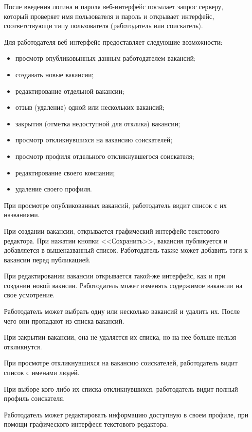 \documentclass[a4page]{article}
\begin{document}
После введения логина и пароля веб-интерфейс посылает запрос серверу, который проверяет имя пользователя и пароль и открывает интерфейс, соответствующи типу пользователя (работодатель или соискатель).

Для работодателя веб-интерфейс предоставляет следующие возможности:

\begin{itemize}
  \item просмотр опубликовынных данным работодателем вакансий;
  \item создавать новые вакансии;
  \item редактирование отдельной вакансии;
  \item отзыв (удаление) одной или нескольких вакансий;
  \item закрытия (отметка недоступной для отклика) вакансии;
  \item просмотр откликнувшихся на вакансию соискателей;
  \item просмотр профиля отдельного откликнувшегося соискателя;
  \item редактирование своего компании;
  \item удаление своего профиля.
\end{itemize}

При просмотре опубликованных вакансий, работодатель видит список с их названиями.

При создании вакансии, открывается графический интерфейс текстового редактора. При нажатии кнопки <<Сохранить>>, вакансия публикуется и добавляется в вышеназванный список. Работодатель также может добавить тэги к вакансии перед публикацией.

При редактировании вакансии открывается такой-же интерфейс, как и при создании новой вакнсии. Работодатель может изменять содержимое вакансии на свое усмотрение.

Работодатель может выбрать одну или несколько вакансий и удалить их. После чего они пропадают из списка вакансий.

При закрытии вакансии, она не удаляется их списка, но на нее больше нельзя откликнутся.

При просмотре откликнувшихся на вакансию соискателей, работодатель видит список с именами людей.

При выборе кого-либо их списка откликнувшихся, работодатель видит полный профиль соискателя.

Работодатель может редактировать информацию доступную в своем профиле, при помощи графического интерфеся текстового редактора.
\end{document}

